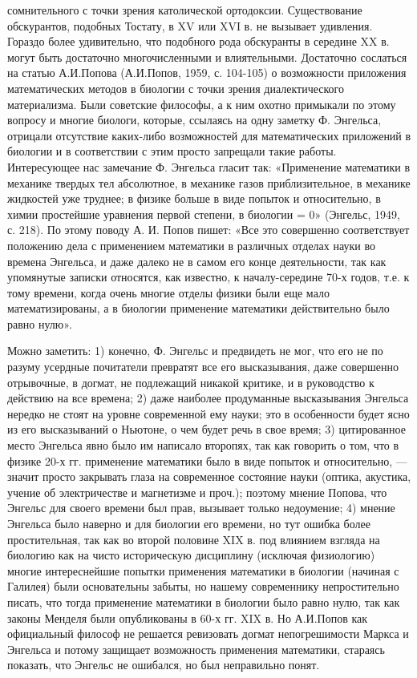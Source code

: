 сомнительного с точки зрения католической ортодоксии. Существование
обскурантов, подобных Тостату, в XV или XVI в. не вызывает удивления.
Гораздо более удивительно, что подобного рода обскуранты в середине XX
в. могут быть достаточно многочисленными и влиятельными. Достаточно
сослаться на статью А.И.Попова (А.И.Попов, 1959, с. 104-105) о
возможности приложения математических методов в биологии с точки
зрения диалектического материализма. Были советские философы, а к ним
охотно примыкали по этому вопросу и многие биологи, которые, ссылаясь
на одну заметку Ф. Энгельса, отрицали отсутствие каких-либо
возможностей для математических приложений в биологии и в соответствии
с этим просто запрещали такие работы. Интересующее нас замечание Ф.
Энгельса гласит так: «Применение математики в механике твердых тел
абсолютное, в механике газов приблизительное, в механике жидкостей уже
труднее; в физике больше в виде попыток и относительно, в химии
простейшие уравнения первой степени, в биологии = 0» (Энгельс, 1949,
с. 218). По этому поводу А. И. Попов пишет: «Все это совершенно
соответствует положению дела с применением математики в различных
отделах науки во времена Энгельса, и даже далеко не в самом его конце
деятельности, так как упомянутые записки относятся, как известно, к
началу-середине 70-х годов, т.е. к тому времени, когда очень многие
отделы физики были еще мало математизированы, а в биологии применение
математики действительно было равно нулю».

Можно заметить: 1) конечно, Ф. Энгельс и предвидеть не мог, что его не
по разуму усердные почитатели превратят все его высказывания, даже
совершенно отрывочные, в догмат, не подлежащий никакой критике, и в
руководство к действию на все времена; 2) даже наиболее продуманные
высказывания Энгельса нередко не стоят на уровне современной ему
науки; это в особенности будет ясно из его высказываний о Ньютоне, о
чем будет речь в свое время; 3) цитированное место Энгельса явно было
им написало второпях, так как говорить о том, что в физике 20-х гг.
применение математики было в виде попыток и относительно, --- значит
просто закрывать глаза на современное состояние науки (оптика,
акустика, учение об электричестве и магнетизме и проч.); поэтому
мнение Попова, что Энгельс для своего времени был прав, вызывает
только недоумение; 4) мнение Энгельса было наверно и для биологии его
времени, но тут ошибка более простительная, так как во второй половине
XIX в. под влиянием взгляда на биологию как на чисто историческую
дисциплину (исключая физиологию) многие интереснейшие попытки
применения математики в биологии (начиная с Галилея) были основательны
забыты, но нашему современнику непростительно писать, что тогда
применение математики в биологии было равно нулю, так как законы
Менделя были опубликованы в 60-х гг. XIX в. Но А.И.Попов как
официальный философ не решается ревизовать догмат непогрешимости
Маркса и Энгельса и потому защищает возможность применения математики,
стараясь показать, что Энгельс не ошибался, но был неправильно понят.

